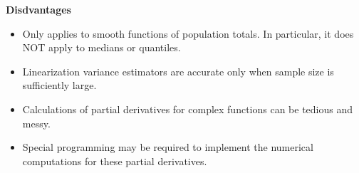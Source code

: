 \vskip 0.5cm
\noindent
\textbf{Disdvantages}
\begin{itemize}
\item
	Only applies to smooth functions of population totals.
	In particular, it does NOT apply to medians or quantiles.
\item
	Linearization variance estimators are accurate only when sample size is sufficiently large.
\item
	Calculations of partial derivatives for complex functions can be tedious and messy.
\item
	Special programming may be required to implement the numerical computations for these partial derivatives.
\end{itemize}

